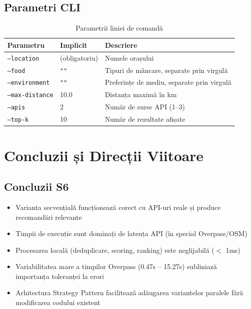 \documentclass[12pt,a4paper]{article}
\begin{document}
\subsection{Parametri CLI}

\begin{table}[H]
\centering
\begin{tabular}{lll}
\toprule
\textbf{Parametru} & \textbf{Implicit} & \textbf{Descriere} \\
\midrule
\texttt{--location} & (obligatoriu) & Numele orașului \\
\texttt{--food} & \texttt{""} & Tipuri de mâncare, separate prin virgulă \\
\texttt{--environment} & \texttt{""} & Preferințe de mediu, separate prin virgulă \\
\texttt{--max-distance} & 10.0 & Distanța maximă în km \\
\texttt{--apis} & 2 & Număr de surse API (1--3) \\
\texttt{--top-k} & 10 & Număr de rezultate afișate \\
\bottomrule
\end{tabular}
\caption{Parametrii liniei de comandă}
\label{tab:cli}
\end{table}

\section{Concluzii și Direcții Viitoare}

\subsection{Concluzii S6}

\begin{itemize}
    \item Varianta secvențială funcționează corect cu API-uri reale și produce recomandări relevante
    \item Timpii de execuție sunt dominați de latența API (în special Overpass/OSM)
    \item Procesarea locală (deduplicare, scoring, ranking) este neglijabilă ($<$ 1ms)
    \item Variabilitatea mare a timpilor Overpass (0.47s -- 15.27s) subliniază importanța toleranței la erori
    \item Arhitectura Strategy Pattern facilitează adăugarea variantelor paralele fără modificarea codului existent
\end{itemize}
\end{document}
